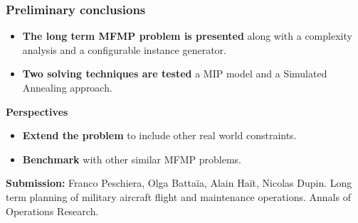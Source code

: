 \begin{frame}
\frametitle{\textbf{Preliminary conclusions}}
  \begin{block}{}
    \begin{itemize}
    \item \textbf{The long term MFMP problem is presented}
      along with a complexity analysis and a configurable instance generator.
      
    \item \textbf{Two solving techniques are tested}
      a MIP model and a Simulated Annealing approach.
      
    \end{itemize}
  \end{block}  
  \pause
  \begin{block}{\textbf{Perspectives}}
    \begin{itemize}
      \item \textbf{Extend the problem} to include other real world constraints.
        
      \item \textbf{Benchmark} with other similar MFMP problems.
        
    \end{itemize}
  \end{block}
  \pause
  \textbf{Submission:} Franco Peschiera, Olga Battaïa, Alain Haït, Nicolas Dupin. Long term planning of military aircraft flight and maintenance operations. Annals of Operations Research.
\end{frame}
